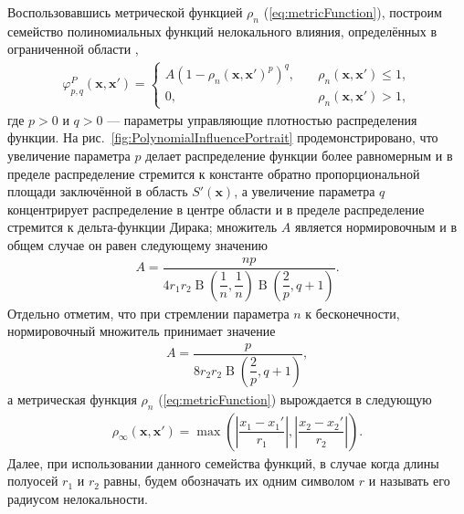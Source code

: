 Воспользовавшись метрической функцией $\rho_n$ (\ref{eq:metricFunction}), построим семейство полиномиальных функций нелокального влияния, определённых в ограниченной области \cite{PolynomialInfluence},
\begin{gather}
	\label{eq:polynomialInfluence}
	\varphi_{p,q}^{P}(\boldsymbol{x}, \boldsymbol{x}') =
	\begin{cases}
		A(1 - \rho_n(\boldsymbol{x}, \boldsymbol{x}')^p)^q, \quad &\rho_n(\boldsymbol{x}, \boldsymbol{x}') \leqslant 1, \\
		0, &\rho_n(\boldsymbol{x}, \boldsymbol{x}') > 1,
	\end{cases}
\end{gather}
где $p > 0$ и $q > 0$ --- параметры управляющие плотностью распределения функции. На рис.~\ref{fig:PolynomialInfluencePortrait} продемонстрировано, что увеличение параметра $p$ делает распределение функции более равномерным и в пределе распределение стремится к константе обратно пропорциональной площади заключённой в область $S'(\boldsymbol{x})$, а увеличение параметра $q$ концентрирует распределение в центре области и в пределе распределение стремится к дельта-функции Дирака; множитель $A$ является нормировочным и в общем случае он равен следующему значению
\begin{gather*}
	A = \dfrac{np}
	{
		4 r_1 r_2 
		\operatorname{B}\left( \dfrac{1}{n}, \dfrac{1}{n} \right) 
		\operatorname{B}\left( \dfrac{2}{p}, q+1 \right)
	}.
\end{gather*}
Отдельно отметим, что при стремлении параметра $n$ к бесконечности, нормировочный множитель принимает значение
\begin{gather*}
	A = \dfrac{p}{8 r_2 r_2 \operatorname{B}\left( \dfrac{2}{p}, q+1 \right)},
\end{gather*}
а метрическая функция $\rho_n$ (\ref{eq:metricFunction}) вырождается в следующую
\begin{gather}
	\label{eq:metricFunctionInfinity}
	\rho_{\infty} (\boldsymbol{x}, \boldsymbol{x}') = 
	\max \left( 
		\left| \dfrac{x_1 - x_1'}{r_1} \right|,
		\left| \dfrac{x_2 - x_2'}{r_2} \right|
	\right).
\end{gather}
Далее, при использовании данного семейства функций, в случае когда длины полуосей $r_1$ и $r_2$ равны, будем обозначать их одним символом $r$ и называть его радиусом нелокальности.

